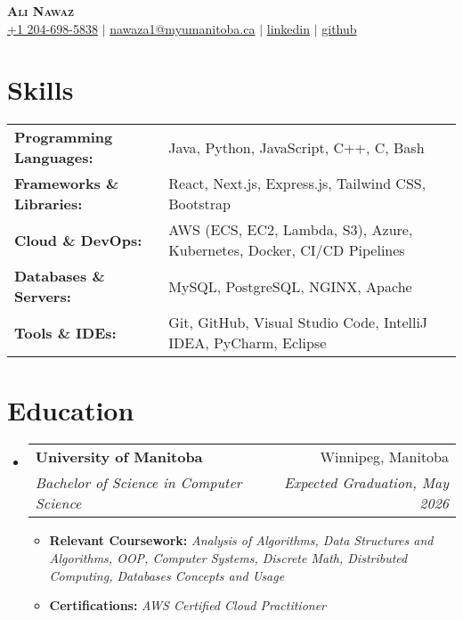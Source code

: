 \documentclass[letterpaper,11pt]{article}
\makeatletter
\newcommand{\resumeItem}[1]{
  \item\small{
    {#1 \vspace{-2pt}}
  }
}
\newcommand{\resumeSubheading}[4]{
  \vspace{-2pt}\item
    \begin{tabular*}{0.97\textwidth}[t]{l@{\extracolsep{\fill}}r}
      \textbf{#1} & #2 \\
      \textit{\small#3} & \textit{\small #4} \\
    \end{tabular*}\vspace{-4pt} %
}
\newcommand{\resumeSubHeadingListStart}{\begin{itemize}[leftmargin=0.15in, label={}]}
\newcommand{\resumeSubHeadingListEnd}{\end{itemize}}
\newcommand{\resumeItemListStart}{\begin{itemize}}
\newcommand{\resumeItemListEnd}{\end{itemize}\vspace{-6pt}} %
\makeatother
\begin{document}
\begin{center}
    \textbf{\Huge \scshape Ali Nawaz} \\ \vspace{1pt}
    \small 
     \href{tel:+12046985838}{+1 204-698-5838} $|$ 
     \href{mailto:nawaza1@myumanitoba.ca}{nawaza1@myumanitoba.ca} $|$ 
     \href{https://www.linkedin.com/in/ali-nawaz-385a0b172/}{linkedin} $|$
     \href{https://github.com/Ali90922}{github}
\end{center}

\section{Skills}

\begin{tabularx}{\textwidth}{>{\bfseries}l X}
Programming Languages: & Java, Python, JavaScript, C++, C, Bash \\
Frameworks \& Libraries: & React, Next.js, Express.js, Tailwind CSS, Bootstrap \\
Cloud \& DevOps: & AWS (ECS, EC2, Lambda, S3), Azure, Kubernetes, Docker, CI/CD Pipelines \\
Databases \& Servers: & MySQL, PostgreSQL, NGINX, Apache \\
Tools \& IDEs: & Git, GitHub, Visual Studio Code, IntelliJ IDEA, PyCharm, Eclipse \\
\end{tabularx}

\vspace{-7pt}

\section{Education}
\resumeSubHeadingListStart
    \resumeSubheading
      {University of Manitoba}{Winnipeg, Manitoba}
      {Bachelor of Science in Computer Science}{Expected Graduation, May 2026}
      \resumeItemListStart
        \resumeItem{\textbf{Relevant Coursework:} \textit{Analysis of Algorithms, Data Structures and Algorithms, OOP, Computer Systems, Discrete Math, Distributed Computing, Databases Concepts and Usage}}
        \resumeItem{\textbf{Certifications:} \textit{AWS Certified Cloud Practitioner}}
      \resumeItemListEnd
\resumeSubHeadingListEnd

\end{document}
